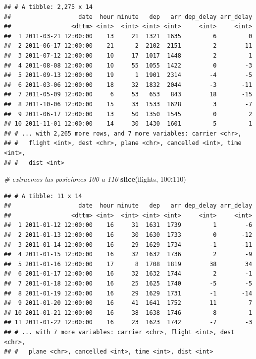 \documentclass[]{article}
\newenvironment{Shaded}{\begin{snugshade}}{\end{snugshade}}
\newcommand{\KeywordTok}[1]{\textcolor[rgb]{0.13,0.29,0.53}{\textbf{#1}}}
\newcommand{\DataTypeTok}[1]{\textcolor[rgb]{0.13,0.29,0.53}{#1}}
\newcommand{\DecValTok}[1]{\textcolor[rgb]{0.00,0.00,0.81}{#1}}
\newcommand{\FloatTok}[1]{\textcolor[rgb]{0.00,0.00,0.81}{#1}}
\newcommand{\CommentTok}[1]{\textcolor[rgb]{0.56,0.35,0.01}{\textit{#1}}}
\newcommand{\OperatorTok}[1]{\textcolor[rgb]{0.81,0.36,0.00}{\textbf{#1}}}
\newcommand{\NormalTok}[1]{#1}
\begin{document}
\begin{Shaded}
\end{Shaded}

\begin{verbatim}
## # A tibble: 2,275 x 14
##                   date  hour minute   dep   arr dep_delay arr_delay
##                 <dttm> <int>  <int> <int> <int>     <int>     <int>
##  1 2011-03-21 12:00:00    13     21  1321  1635         6         0
##  2 2011-06-17 12:00:00    21      2  2102  2151         2        11
##  3 2011-07-12 12:00:00    10     17  1017  1448         2         1
##  4 2011-08-08 12:00:00    10     55  1055  1422         0        -3
##  5 2011-09-13 12:00:00    19      1  1901  2314        -4        -5
##  6 2011-03-06 12:00:00    18     32  1832  2044        -3       -11
##  7 2011-05-09 12:00:00     6     53   653   843        18       -15
##  8 2011-10-06 12:00:00    15     33  1533  1628         3        -7
##  9 2011-06-17 12:00:00    13     50  1350  1545         0         2
## 10 2011-11-01 12:00:00    14     30  1430  1601         5         1
## # ... with 2,265 more rows, and 7 more variables: carrier <chr>,
## #   flight <int>, dest <chr>, plane <chr>, cancelled <int>, time <int>,
## #   dist <int>
\end{verbatim}

\begin{Shaded}
\begin{Highlighting}[]
\CommentTok{# extraemos las posiciones 100 a 110}
\KeywordTok{slice}\NormalTok{(flights, }\DecValTok{100}\OperatorTok{:}\DecValTok{110}\NormalTok{)}
\end{Highlighting}
\end{Shaded}

\begin{verbatim}
## # A tibble: 11 x 14
##                   date  hour minute   dep   arr dep_delay arr_delay
##                 <dttm> <int>  <int> <int> <int>     <int>     <int>
##  1 2011-01-12 12:00:00    16     31  1631  1739         1        -6
##  2 2011-01-13 12:00:00    16     30  1630  1733         0       -12
##  3 2011-01-14 12:00:00    16     29  1629  1734        -1       -11
##  4 2011-01-15 12:00:00    16     32  1632  1736         2        -9
##  5 2011-01-16 12:00:00    17      8  1708  1819        38        34
##  6 2011-01-17 12:00:00    16     32  1632  1744         2        -1
##  7 2011-01-18 12:00:00    16     25  1625  1740        -5        -5
##  8 2011-01-19 12:00:00    16     29  1629  1731        -1       -14
##  9 2011-01-20 12:00:00    16     41  1641  1752        11         7
## 10 2011-01-21 12:00:00    16     38  1638  1746         8         1
## 11 2011-01-22 12:00:00    16     23  1623  1742        -7        -3
## # ... with 7 more variables: carrier <chr>, flight <int>, dest <chr>,
## #   plane <chr>, cancelled <int>, time <int>, dist <int>
\end{verbatim}
\end{document}
